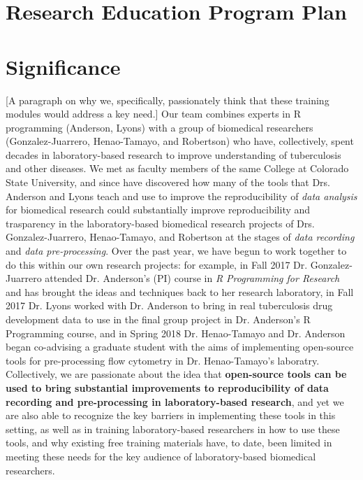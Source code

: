 \documentclass[pdftex,english,11pt,parskip=half]{scrartcl}
\begin{document}
\def\bf{\normalfont\bfseries}
\pagestyle{empty}

\section*{Research Education Program Plan}

\section{Significance}
\vspace{-0.1in}

[A paragraph on why we, specifically, passionately think that these training modules would address a key need.] Our team combines experts in R programming (Anderson, Lyons) with a group of biomedical researchers (Gonzalez-Juarrero, Henao-Tamayo, and Robertson) who have, collectively, spent decades in laboratory-based research to improve understanding of tuberculosis and other diseases. We met as faculty members of the same College at Colorado State University, and since have discovered how many of the tools that Drs. Anderson and Lyons teach and use to improve the reproducibility of \textit{data analysis} for biomedical research could substantially improve reproducibility and trasparency in the laboratory-based biomedical research projects of Drs. Gonzalez-Juarrero, Henao-Tamayo, and Robertson at the stages of \textit{data recording} and \textit{data pre-processing}. Over the past year, we have begun to work together to do this within our own research projects: for example, in Fall 2017 Dr. Gonzalez-Juarrero attended Dr. Anderson's (PI) course in \textit{R Programming for Research} and has brought the ideas and techniques back to her research laboratory, in Fall 2017 Dr. Lyons worked with Dr. Anderson to bring in real tuberculosis drug development data to use in the final group project in Dr. Anderson's R Programming course, and in Spring 2018 Dr. Henao-Tamayo and Dr. Anderson began co-advising a graduate student with the aims of implementing open-source tools for pre-processing flow cytometry in Dr. Henao-Tamayo's laboratry. Collectively, we are passionate about the idea that \textbf{open-source tools can be used to bring substantial improvements to reproducibility of data recording and pre-processing in laboratory-based research}, and yet we are also able to recognize the key barriers in implementing these tools in this setting, as well as in training laboratory-based researchers in how to use these tools, and why existing free training materials have, to date, been limited in meeting these needs for the key audience of laboratory-based biomedical researchers. 
\end{document}
